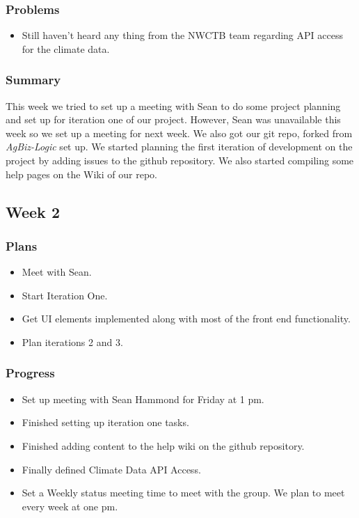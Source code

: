 \documentclass[onecolumn, draftclsnofoot,10pt, compsoc]{article}
\begin{document}
			\subsubsection{Problems}
				\begin{itemize}
					\item Still haven't heard any thing from the NWCTB team regarding API access for the climate data.
				\end{itemize}

			\subsubsection{Summary}
			This week we tried to set up a meeting with Sean to do some project planning and set up for iteration one of our project. However, Sean was unavailable this week so we set up a meeting for next week. We also got our git repo, forked from \textit{AgBiz-Logic} set up. We started planning the first iteration of development on the project by adding issues to the github repository. We also started compiling some help pages on the Wiki of our repo.\\

		\subsection{Week 2}
			\subsubsection{Plans}
				\begin{itemize}
					\item Meet with Sean.
					\item Start Iteration One.
					\item Get UI elements implemented along with most of the front end functionality.
					\item Plan iterations 2 and 3.
				\end{itemize}
			\subsubsection{Progress}
				\begin{itemize}
					\item Set up meeting with Sean Hammond for Friday at 1 pm.
					\item Finished setting up iteration one tasks.
					\item Finished adding content to the help wiki on the github repository.
					\item Finally defined Climate Data API Access.
					\item Set a Weekly status meeting time to meet with the group. We plan to meet every week at one pm.
				\end{itemize}
\end{document}
